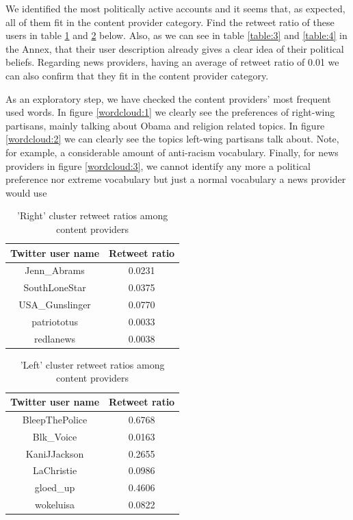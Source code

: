 \documentclass[12pt, authoryear]{elsarticle}
\begin{document}
We identified the most politically active accounts and it seems that, as expected, all of them fit in the content provider category. Find the retweet ratio of these users in table \ref{table:1} and \ref{table:2} below. Also, as we can see in table \ref{table:3} and \ref{table:4} in the Annex, that their user description already gives a clear idea of their political beliefs. Regarding news providers, having an average of retweet ratio of 0.01 we can also confirm that they fit in the content provider category.

As an exploratory step, we have checked the content providers' most frequent used words. In figure \ref{wordcloud:1} we clearly see the preferences of right-wing partisans, mainly talking about Obama and religion related topics. In figure \ref{wordcloud:2} we can clearly see the topics left-wing partisans talk about. Note, for example, a considerable amount of anti-racism vocabulary. Finally, for news providers in figure \ref{wordcloud:3}, we cannot identify any more a political preference nor extreme vocabulary but just a normal vocabulary a news provider would use

\begin{center}
\begin{table}[H]
\begin{tabular}{ c c }
Twitter user name & Retweet ratio \\
 \hline
Jenn\_Abrams	&	0.0231\\
SouthLoneStar	&	0.0375\\
USA\_Gunslinger&	0.0770\\
patriototus		&	0.0033\\
redlanews		&	0.0038\\
 \hline
\end{tabular}
\caption{'Right' cluster retweet ratios among content providers}
\label{table:1}
\end{table}
\end{center}

\begin{center}
\begin{table}[H]
\begin{tabular}{ c c }
Twitter user name & Retweet ratio \\
 \hline
BleepThePolice &   0.6768 \\
Blk\_Voice       &  0.0163 \\
KaniJJackson   &   0.2655 \\
LaChristie  &      0.0986 \\
gloed\_up       &   0.4606 \\
wokeluisa     &    0.0822 \\
 \hline
\end{tabular}
\caption{'Left' cluster retweet ratios among content providers}
\label{table:2}
\end{table}
\end{center}
\end{document}
